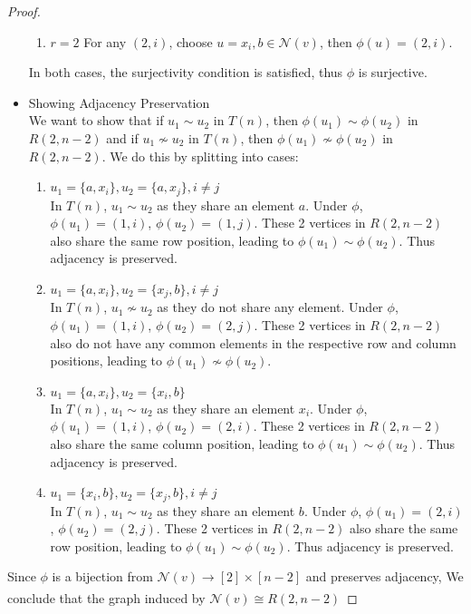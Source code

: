 \begin{proof}
\begin{itemize}
\begin{enumerate}
            \item $r=2$
            For any $(2,i)$, choose $u = {x_i,b}\in \mathcal{N}(v)$, then $\phi(u) = (2,i)$.
        \end{enumerate}
        In both cases, the surjectivity condition is satisfied, thus $\phi$ is surjective.

        \item Showing Adjacency Preservation\\
        We want to show that if $u_1\sim u_2$ in $T(n)$, then $\phi(u_1) \sim \phi(u_2)$ in $R(2,n-2)$ and if $u_1\nsim u_2$ in $T(n)$, then $\phi(u_1) \nsim \phi(u_2)$ in $R(2,n-2)$. We do this by splitting into cases:
        \begin{enumerate}
            \item $u_1=\{a,x_i\}, u_2=\{a,x_j\}, i\neq j$\\
            In $T(n)$, $u_1 \sim u_2$ as they share an element $a$. Under $\phi$, $\phi(u_1) = (1,i)$, $\phi(u_2) = (1,j)$. These 2 vertices in $R(2,n-2)$ also share the same row position, leading to $\phi(u_1)\sim\phi(u_2)$. Thus adjacency is preserved.

            \item $u_1=\{a,x_i\}, u_2=\{x_j,b\}, i\neq j$\\
            In $T(n)$, $u_1 \nsim u_2$ as they do not share any element. Under $\phi$, $\phi(u_1) = (1,i)$, $\phi(u_2) = (2,j)$. These 2 vertices in $R(2,n-2)$ also do not have any common elements in the respective row and column positions, leading to $\phi(u_1)\nsim\phi(u_2)$. 

            \item  $u_1=\{a,x_i\}, u_2=\{x_i,b\}$\\
            In $T(n)$, $u_1 \sim u_2$ as they share an element $x_i$. Under $\phi$, $\phi(u_1) = (1,i)$, $\phi(u_2) = (2,i)$. These 2 vertices in $R(2,n-2)$ also share the same column position, leading to $\phi(u_1)\sim\phi(u_2)$. Thus adjacency is preserved.

            \item $u_1=\{x_i,b\}, u_2=\{x_j,b\}, i\neq j$\\
            In $T(n)$, $u_1 \sim u_2$ as they share an element $b$. Under $\phi$, $\phi(u_1) = (2,i)$, $\phi(u_2) = (2,j)$. These 2 vertices in $R(2,n-2)$ also share the same row position, leading to $\phi(u_1)\sim\phi(u_2)$. Thus adjacency is preserved.
        \end{enumerate}
    \end{itemize}
    Since $\phi$ is a bijection from $\mathcal{N}(v)\xrightarrow[]{}[2]\times[n-2]$ and preserves adjacency, We conclude that the graph induced by $\mathcal{N}(v)\cong R(2,n-2)$ 
\end{proof}

